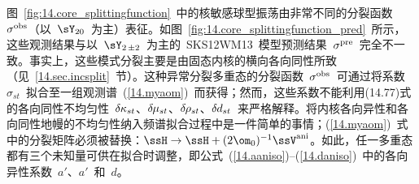 图~\ref{fig:14.core_splittingfunction}~中的核敏感球型振荡由非常不同的分裂函数~$\sigma^{\rm obs}$（以~$\sY_{20}$~为主）表征。如图~\ref{fig:14.core_splittingfunction_pred}~所示，这些观测结果与以~$\sY_{2\,\pm 2}$~为主的~SKS12WM13~模型预测结果~$\sigma^{\rm pre}$~完全不一致。事实上，这些模式分裂主要是由固态内核的横向各向同性所致（见~\ref{14.sec.incsplit}~节）。这种异常分裂多重态的分裂函数~$\sigma^{\rm obs}$~可通过将系数~$\sigma_{st}$~拟合至一组观测谱~(\ref{14.myaom})~而获得；然而，这些系数不能利用(14.77)式的各向同性不均匀性~$\delta\hspace{-0.1 mm}\kappa_{st}$、$\delta\hspace{-0.2 mm}\mu_{st}$、$\delta\hspace{-0.2 mm}\rho_{st}$、$\delta\hspace{-0.1 mm}d_{st}$~来严格解释。将内核各向异性和各向同性地幔的不均匀性纳入频谱拟合过程中是一件简单的事情；(\ref{14.myaom})~式中的分裂矩阵必须被替换：$\ssH\rightarrow\ssH+(2\om_0)^{-1}\ssV^{\rm ani}$。如此，任一多重态都有三个未知量可供在拟合时调整，即公式~(\ref{14.aaniso})--(\ref{14.daniso})~中的各向异性系数~$a'$、$a'$~和~$d$。

